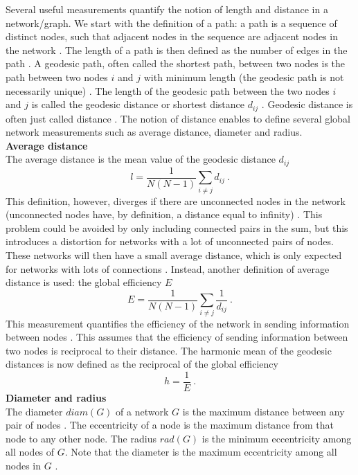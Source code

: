 \documentclass[11 pt , letterpaper , twoside , openright]{book}
\begin{document}
Several useful measurements quantify the notion of length and distance in a network/graph. We start with the definition of a path: a path is a sequence of distinct nodes, such that adjacent nodes in the sequence are adjacent nodes in the network \cite{Goddard2010}. The length of a path is then defined as the number of edges in the path \cite{Goddard2010}. A geodesic path, often called the shortest path, between two nodes is the path between two nodes $i$ and $j$ with minimum length (the geodesic path is not necessarily unique) \cite{F.Costa2007}. The length of the geodesic path between the two nodes $i$ and $j$ is called the geodesic distance or shortest distance $d_{ij}$ \cite{F.Costa2007}. Geodesic distance is often just called distance \cite{Goddard2010}. The notion of distance enables to define several global network measurements such as average distance, diameter and radius.\\  
\newline
\textbf{Average distance}\\
\newline
The average distance is the mean value of the geodesic distance $d_{ij}$ \cite{F.Costa2007}
\begin{equation}\label{avdist}
	l = \frac{1}{N(N-1)} \sum_{i \neq j} d_{ij} \ .
\end{equation}
This definition, however, diverges if there are unconnected nodes in the network (unconnected nodes have, by definition, a distance equal to infinity) \cite{F.Costa2007}. This problem could be avoided by only including connected pairs in the sum, but this introduces a distortion for networks with a lot of unconnected pairs of nodes. These networks will then have a small average distance, which is only expected for networks with lots of connections \cite{F.Costa2007}. Instead, another definition of average distance is used: the global efficiency $E$ \cite{F.Costa2007}
\begin{equation}
	E = \frac{1}{N(N-1)} \sum_{i \neq j} \frac{1}{d_{ij}} \ .
\end{equation}
This measurement quantifies the efficiency of the network in sending information between nodes \cite{F.Costa2007}. This assumes that the efficiency of sending information between two nodes is reciprocal to their distance. The harmonic mean of the geodesic distances is now defined as the reciprocal of the global efficiency \cite{F.Costa2007}
\begin{equation}
 	h = \frac{1}{E} \ .
\end{equation}
\newline
\textbf{Diameter and radius}\\
\newline
The diameter $diam(G)$ of a network $G$ is the maximum distance between any pair of nodes \cite{Goddard2010}. The eccentricity of a node is the maximum distance from that node to any other node. The radius $rad(G)$ is the minimum eccentricity among all nodes of $G$. Note that the diameter is the maximum eccentricity among all nodes in $G$ \cite{Goddard2010}.
\newpage
\noindent
\end{document}
